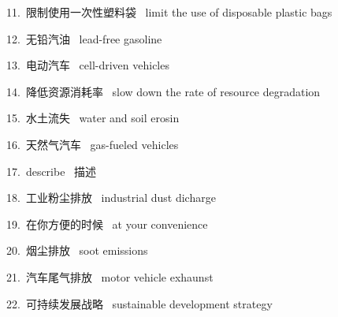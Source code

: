 \documentclass[a4paper, 12pt]{article}
\begin{document}
\begin{multicols}{2}
\begin{flushleft}
11.\ 限制使用一次性塑料袋 \ limit the use of disposable plastic bags
\end{flushleft}

\begin{flushleft}
12.\ 无铅汽油 \ lead-free gasoline
\end{flushleft}
\end{multicols}

\begin{multicols}{2}
\begin{flushleft}
13.\ 电动汽车 \ cell-driven vehicles
\end{flushleft}

\begin{flushleft}
14.\ 降低资源消耗率 \ slow down the rate of resource degradation
\end{flushleft}
\end{multicols}

\begin{multicols}{2}
\begin{flushleft}
15.\ 水土流失 \ water and soil erosin
\end{flushleft}

\begin{flushleft}
16.\ 天然气汽车 \ gas-fueled vehicles
\end{flushleft}
\end{multicols}

\begin{multicols}{2}
\begin{flushleft}
17.\ describe \ 描述
\end{flushleft}

\begin{flushleft}
18.\ 工业粉尘排放 \ industrial dust dicharge
\end{flushleft}
\end{multicols}

\begin{multicols}{2}
\begin{flushleft}
19.\ 在你方便的时候 \ at your convenience
\end{flushleft}

\begin{flushleft}
20.\ 烟尘排放 \ soot emissions 
\end{flushleft}
\end{multicols}

\begin{multicols}{2}
\begin{flushleft}
21.\ 汽车尾气排放 \ motor vehicle exhaunst
\end{flushleft}

\begin{flushleft}
22.\ 可持续发展战略 \ sustainable development strategy
\end{flushleft}
\end{multicols}
\end{document}
